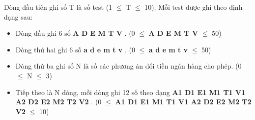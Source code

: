 Dòng đầu tiên ghi số T là số test (1  $\le$  T  $\le$  10). Mỗi test được ghi theo định dạng sau:
\begin{itemize}
	\item Dòng đầu ghi 6 số \textbf{ A D E M T V } . (0  $\le$  \textbf{ A D E M T V }  $\le$  50)
	\item Dòng thứ hai ghi 6 số \textbf{ a d e m t v } . (0  $\le$  \textbf{ a d e m t v }  $\le$  50)
	\item Dòng thứ ba ghi số N là số các phương án đổi tiền ngân hàng cho phép. (0  $\le$  N  $\le$  3)
	\item Tiếp theo là N dòng, mỗi dòng ghi 12 số theo dạng \textbf{ A1 D1 E1 M1 T1 V1 A2 D2 E2 M2 T2 V2 } . (0  $\le$  \textbf{ A1 D1 E1 M1 T1 V1 A2 D2 E2 M2 T2 V2 }  $\le$  10)
\end{itemize}